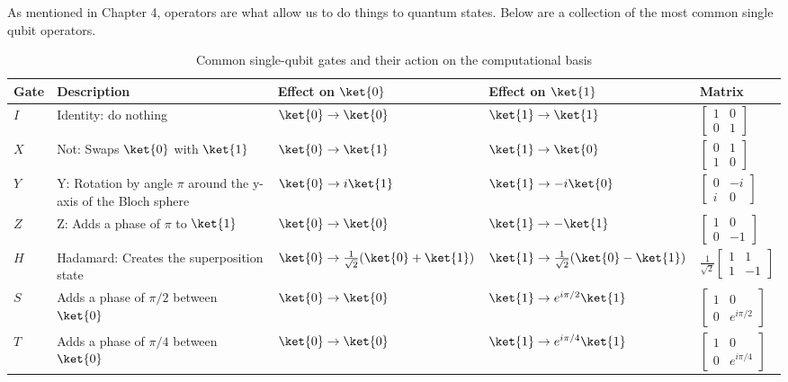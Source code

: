 \documentclass{book}
\begin{document}
As mentioned in Chapter 4, operators are what allow us to do things to quantum states. Below are a collection of the most common single qubit operators. 
\begin{table}[ht!]
\centering

\label{tab:single_qubit_gates}
\begin{tabular}{|m{1cm}| m{5cm} | m{3cm} | m{3cm} | m{2cm}|} 
\hline
 Gate & Description & Effect on $\ket{0}$ & Effect on $\ket{1}$ & Matrix \\ [0.5ex] 
\hline
 $I$ & Identity: do nothing & $\ket{0} \rightarrow  \ket{0} $ & $\ket{1} \rightarrow \ket{1}$ & $\begin{bmatrix} 1 & 0 \\ 0 & 1 \end{bmatrix}$ \\ 
\hline
 $X$ & Not: Swaps $\ket{0}$ with $\ket{1}$   &$\ket{0} \rightarrow \ket{1}$ &$\ket{1} \rightarrow  \ket{0}$ & $\begin{bmatrix} 0 & 1 \\ 1 & 0 \end{bmatrix}$ \\
\hline
 $Y$ & Y: Rotation by angle $\pi$ around the y-axis of the Bloch sphere & $\ket{0} \rightarrow  i\ket{1} $ & $\ket{1} \rightarrow -i\ket{0} $ & $\begin{bmatrix} 0 & -i \\ i & 0 \end{bmatrix}$ \\
\hline
 $Z$ & Z: Adds a phase of $\pi$ to $\ket{1}$&$\ket{0} \rightarrow \ket{0}$&$\ket{1} \rightarrow -\ket{1}$ &$\begin{bmatrix} 1 & 0 \\ 0 & -1 \end{bmatrix}$  \\
\hline
 $H$ & Hadamard: Creates the superposition state & $\ket{0} \rightarrow \frac{1}{\sqrt{2}} ( \ket{0} + \ket{1})$ & $\ket{1} \rightarrow \frac{1}{\sqrt{2}} ( \ket{0} - \ket{1})$ & $\frac{1}{\sqrt{2}}\begin{bmatrix} 1 & 1 \\ 1 & -1 \end{bmatrix} $\\
\hline
 $S$ & Adds a phase of $\pi/2$ between $\ket{0}$ &$\ket{0} \rightarrow  \ket{0} $ &$\ket{1} \rightarrow e^{i\pi/2}\ket{1}$  & $\begin{bmatrix} 1 & 0 \\ 0 & e^{i\pi/2} \end{bmatrix}$\\
\hline
 $T$ & Adds a phase of $\pi/4$ between $\ket{0}$ &  $\ket{0} \rightarrow  \ket{0} $& $\ket{1} \rightarrow e^{i\pi/4}\ket{1}$ & $\begin{bmatrix} 1 & 0 \\ 0 & e^{i\pi/4} \end{bmatrix}$\\ 
\hline
\end{tabular}
\caption{Common single-qubit gates and their action on the computational basis}
\end{table}
\end{document}
